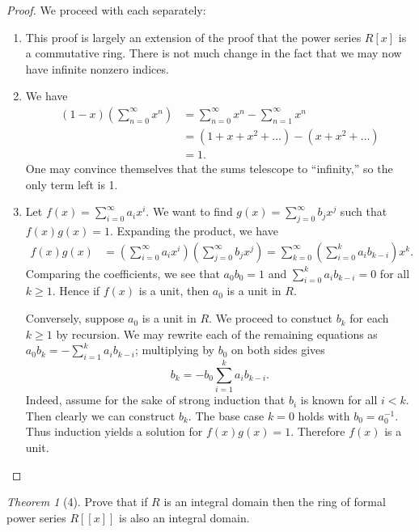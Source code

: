 \documentclass[12pt]{article}
\theoremstyle{remark}
\theoremstyle{named}
\newtheorem*{theorem}{Theorem}
\begin{document}
\begin{proof}
    We proceed with each separately:
    \begin{enumerate}
        \item This proof is largely an extension of the proof that the power series \(R[x]\) is a commutative ring. There is not much change in the fact that we may now have infinite nonzero indices. 
        
        \item We have 
        \begin{align*}
            (1 - x) \left(\sum_{n = 0}^\infty x^n\right) &= \sum_{n = 0}^\infty x^n - \sum_{n = 1}^\infty x^n \\
            &= (1 + x + x^2 + \dots) - (x + x^2 + \dots) \\
            &= 1.
        \end{align*}
        One may convince themselves that the sums telescope to ``infinity,'' so the only term left is 1.
        \item Let \(f(x) = \sum_{i = 0}^\infty a_i x^i\). We want to find \(g(x) = \sum_{j = 0}^\infty b_j x^j\) such that \(f(x)g(x) = 1\). Expanding the product, we have
        \begin{align*}
            f(x)g(x) &= \left(\sum_{i = 0}^\infty a_i x^i\right)\left(\sum_{j = 0}^\infty b_j x^j\right) = \sum_{k = 0}^\infty \left(\sum_{i = 0}^k a_i b_{k - i}\right) x^k.
        \end{align*}
        Comparing the coefficients, we see that \(a_0 b_0 = 1\) and \(\sum_{i = 0}^k a_i b_{k - i} = 0\) for all \(k \ge 1\). Hence if \(f(x)\) is a unit, then \(a_0\) is a unit in \(R\). 
        
        Conversely, suppose \(a_0\) is a unit in \(R\). We proceed to constuct \(b_k\) for each \(k \ge 1\) by recursion. We may rewrite each of the remaining equations as \(a_0 b_k = - \sum_{i = 1}^k a_i b_{k - i}\); multiplying by \(b_0\) on both sides gives
        \[b_k = -b_0\sum_{i = 1}^k a_i b_{k - i}.\]
        Indeed, assume for the sake of strong induction that \(b_i\) is known for all \(i < k\). Then clearly we can construct \(b_k\). The base case \(k = 0\) holds with \(b_0 = a_0^{-1}\). Thus induction yields a solution for \(f(x)g(x) = 1\). Therefore \(f(x)\) is a unit. 
    \end{enumerate}
\end{proof}

\begin{theorem}[4]
    Prove that if \(R\) is an integral domain then the ring of formal power series \(R[[x]]\) is also an integral domain.
\end{theorem}
\end{document}
